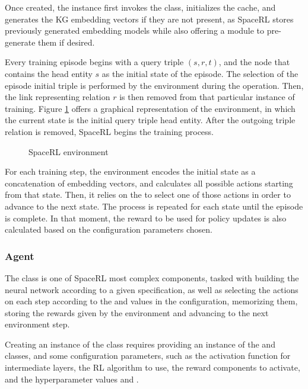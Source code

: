 Once created, the  instance first invokes the  class, initializes the cache, and generates the KG embedding vectors if they are not present, as SpaceRL stores previously generated embedding models while also offering a module to pre-generate them if desired. 

Every training episode begins with a query triple $(s,r,t)$, and the node that contains the head entity $s$ as the initial state of the episode. The selection of the episode initial triple is performed by the environment during the  operation. Then, the link representing relation $r$ is then removed from that particular instance of training. Figure \ref{fig:environment} offers a graphical representation of the environment, in which the current state is the initial query triple head entity. 
After the outgoing triple relation is removed, SpaceRL begins the training process. 


\begin{figure}[!h]
    \centering
    
    \caption{SpaceRL environment}
    \label{fig:environment}
\end{figure}

For each training step, the environment encodes the initial state as a concatenation of embedding vectors, and calculates all possible actions starting from that state. Then, it relies on the  to select one of those actions in order to advance to the next state. The process is repeated for each state until the episode is complete. In that moment, the reward to be used for policy updates is also calculated based on the configuration parameters chosen.

\subsubsection{Agent}
The  class is one of SpaceRL most complex components, tasked with building the neural network according to a given specification, as well as selecting the actions on each step according to the  and  values in the configuration, memorizing them, storing the rewards given by the environment and advancing to the next environment step.

Creating an instance of the  class requires providing an instance of the  and  classes, and some configuration parameters, such as the activation function for intermediate layers, the RL algorithm to use, the reward components to activate, and the hyperparameter values  and .

